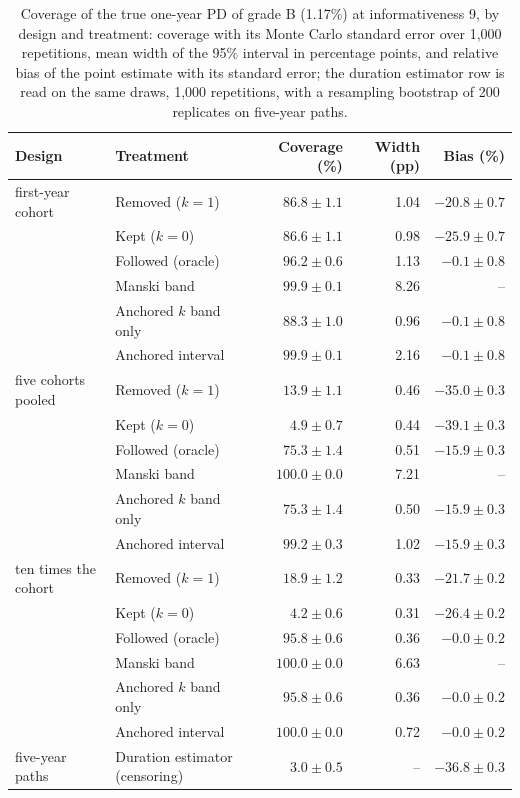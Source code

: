 \begin{table}[htbp]
\centering
\small
\caption{Coverage of the true one-year PD of grade B (1.17\%) at informativeness 9, by design and treatment: coverage with its Monte Carlo standard error over 1,000 repetitions, mean width of the 95\% interval in percentage points, and relative bias of the point estimate with its standard error; the duration estimator row is read on the same draws, 1,000 repetitions, with a resampling bootstrap of 200 replicates on five-year paths.}
\label{tab:main-results}
\begin{tabular}{llrrr}
\toprule
Design & Treatment & Coverage (\%) & Width (pp) & Bias (\%) \\
\midrule
first-year cohort & \relax Removed ($k=1$) & $86.8\pm1.1$ & 1.04 & $-20.8\pm0.7$ \\
 & \relax Kept ($k=0$) & $86.6\pm1.1$ & 0.98 & $-25.9\pm0.7$ \\
 & Followed (oracle) & $96.2\pm0.6$ & 1.13 & $-0.1\pm0.8$ \\
 & Manski band & $99.9\pm0.1$ & 8.26 & -- \\
 & \relax Anchored $k$ band only & $88.3\pm1.0$ & 0.96 & $-0.1\pm0.8$ \\
 & Anchored interval & $99.9\pm0.1$ & 2.16 & $-0.1\pm0.8$ \\
five cohorts pooled & \relax Removed ($k=1$) & $13.9\pm1.1$ & 0.46 & $-35.0\pm0.3$ \\
 & \relax Kept ($k=0$) & $4.9\pm0.7$ & 0.44 & $-39.1\pm0.3$ \\
 & Followed (oracle) & $75.3\pm1.4$ & 0.51 & $-15.9\pm0.3$ \\
 & Manski band & $100.0\pm0.0$ & 7.21 & -- \\
 & \relax Anchored $k$ band only & $75.3\pm1.4$ & 0.50 & $-15.9\pm0.3$ \\
 & Anchored interval & $99.2\pm0.3$ & 1.02 & $-15.9\pm0.3$ \\
ten times the cohort & \relax Removed ($k=1$) & $18.9\pm1.2$ & 0.33 & $-21.7\pm0.2$ \\
 & \relax Kept ($k=0$) & $4.2\pm0.6$ & 0.31 & $-26.4\pm0.2$ \\
 & Followed (oracle) & $95.8\pm0.6$ & 0.36 & $-0.0\pm0.2$ \\
 & Manski band & $100.0\pm0.0$ & 6.63 & -- \\
 & \relax Anchored $k$ band only & $95.8\pm0.6$ & 0.36 & $-0.0\pm0.2$ \\
 & Anchored interval & $100.0\pm0.0$ & 0.72 & $-0.0\pm0.2$ \\
five-year paths & Duration estimator (censoring) & $3.0\pm0.5$ & -- & $-36.8\pm0.3$ \\
\bottomrule
\end{tabular}
\end{table}
